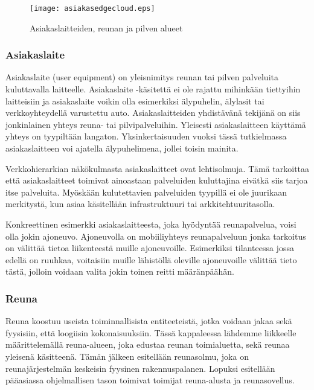 \begin{figure}[tb]
\texttt{[image: asiakasedgecloud.eps]}
\caption{Asiakaslaitteiden, reunan ja pilven alueet} \label{fig:asiakasedgecloud}
\end{figure}

\subsubsection{Asiakaslaite}
Asiakaslaite (user equipment) on yleisnimitys reunan tai pilven palveluita kuluttavalla laitteelle.
Asiakaslaite -käsitettä ei ole rajattu mihinkään tiettyihin laitteisiin ja asiakaslaite voikin olla esimerkiksi älypuhelin, älylasit tai verkkoyhteydellä varustettu auto. 
Asiakaslaitteiden yhdistävänä tekijänä on siis jonkinlainen yhteys reuna- tai pilvipalveluihin. Yleisesti asiakaslaitteen käyttämä yhteys on tyypiltään langaton. 
Yksinkertaisuuden vuoksi tässä tutkielmassa asiakaslaitteen voi ajatella älypuhelimena, jollei toisin mainita.

Verkkohierarkian näkökulmasta asiakaslaitteet ovat lehtisolmuja. Tämä tarkoittaa että asiakaslaitteet toimivat ainoastaan palveluiden kuluttajina eivätkä siis tarjoa itse palveluita. Myöskään kulutettavien palveluiden tyypillä ei ole juurikaan merkitystä, kun asiaa käsitellään infrastruktuuri tai arkkitehtuuritasolla.

Konkreettinen esimerkki asiakaslaitteesta, joka hyödyntää reunapalvelua, voisi olla jokin ajoneuvo.
Ajoneuvolla on mobiiliyhteys reunapalveluun jonka tarkoitus on välittää tietoa liikenteestä muille ajoneuvoille. Esimerkiksi tilanteessa jossa edellä on ruuhkaa, voitaisiin muille lähistöllä oleville ajoneuvoille välittää tieto tästä, jolloin voidaan valita jokin toinen reitti määränpäähän.


\subsubsection{Reuna} \label{reunatoimijat}
Reuna koostuu useista toiminnallisista entiteeteistä, jotka voidaan jakaa sekä fyysisiin, että loogiisin kokonaisuuksiin. 
Tässä kappaleessa lähdemme liikkeelle määrittelemällä reuna-alueen, joka edustaa reunan toimialuetta, sekä reunaa yleisenä käsitteenä.
Tämän jälkeen esitellään reunasolmu, joka on reunajärjestelmän keskeisin fyysinen rakennuspalanen. Lopuksi esitellään pääasiassa ohjelmallisen tason toimivat toimijat reuna-alusta ja reunasovellus.

